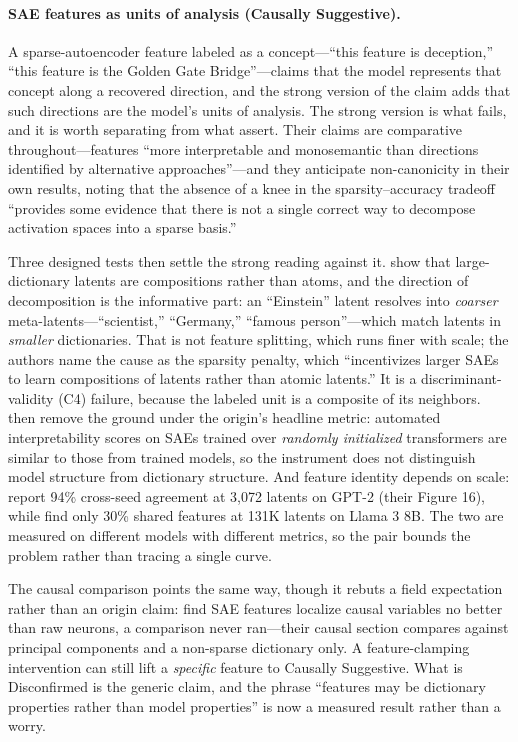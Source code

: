 \documentclass{article}
\begin{document}
\paragraph{SAE features as units of analysis (Causally Suggestive).} A sparse-autoencoder feature labeled as a concept---``this feature is deception,'' ``this feature is the Golden Gate Bridge''---claims that the model represents that concept along a recovered direction, and the strong version of the claim adds that such directions are the model's units of analysis. The strong version is what fails, and it is worth separating from what \citet{cunningham2024sparse} assert. Their claims are comparative throughout---features ``more interpretable and monosemantic than directions identified by alternative approaches''---and they anticipate non-canonicity in their own results, noting that the absence of a knee in the sparsity--accuracy tradeoff ``provides some evidence that there is not a single correct way to decompose activation spaces into a sparse basis.''

Three designed tests then settle the strong reading against it. \citet{leask2025canonical} show that large-dictionary latents are compositions rather than atoms, and the direction of decomposition is the informative part: an ``Einstein'' latent resolves into \emph{coarser} meta-latents---``scientist,'' ``Germany,'' ``famous person''---which match latents in \emph{smaller} dictionaries. That is not feature splitting, which runs finer with scale; the authors name the cause as the sparsity penalty, which ``incentivizes larger SAEs to learn compositions of latents rather than atomic latents.'' It is a discriminant-validity (C4) failure, because the labeled unit is a composite of its neighbors. \citet{heap2025sparse} then remove the ground under the origin's headline metric: automated interpretability scores on SAEs trained over \emph{randomly initialized} transformers are similar to those from trained models, so the instrument does not distinguish model structure from dictionary structure. And feature identity depends on scale: \citet{leask2025canonical} report 94\% cross-seed agreement at 3{,}072 latents on GPT-2 (their Figure 16), while \citet{paulo2025sparse} find only 30\% shared features at 131K latents on Llama 3 8B. The two are measured on different models with different metrics, so the pair bounds the problem rather than tracing a single curve.

The causal comparison points the same way, though it rebuts a field expectation rather than an origin claim: \citet{mueller2025mib} find SAE features localize causal variables no better than raw neurons, a comparison \citet{cunningham2024sparse} never ran---their causal section compares against principal components and a non-sparse dictionary only. A feature-clamping intervention can still lift a \emph{specific} feature to Causally Suggestive. What is Disconfirmed is the generic claim, and the phrase ``features may be dictionary properties rather than model properties'' is now a measured result rather than a worry.
\end{document}
